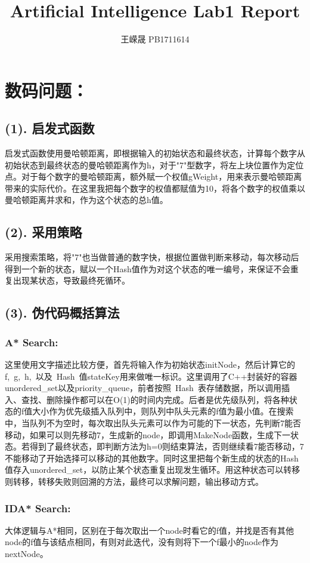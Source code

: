 \documentclass{article}
\title{Artificial Intelligence Lab1 Report}
\author{王嵘晟 \quad PB1711614}
\date{}
\begin{document}
	\maketitle
	\section{数码问题：}
	\subsection*{(1). 启发式函数}
	启发式函数使用曼哈顿距离，即根据输入的初始状态和最终状态，计算每个数字从初始状态到最终状态的曼哈顿距离作为h，对于"7"型数字，将左上块位置作为定位点。对于每个数字的曼哈顿距离，额外赋一个权值gWeight，用来表示曼哈顿距离带来的实际代价。在这里我把每个数字的权值都赋值为10，将各个数字的权值乘以曼哈顿距离并求和，作为这个状态的总h值。
	\subsection*{(2). 采用策略}
	采用搜索策略，将"7"也当做普通的数字快，根据位置做判断来移动，每次移动后得到一个新的状态，赋以一个Hash值作为对这个状态的唯一编号，来保证不会重复出现某状态，导致最终死循环。
	\subsection*{(3). 伪代码概括算法}
	\subsubsection*{A* Search:}
	这里使用文字描述比较方便，首先将输入作为初始状态initNode，然后计算它的f,\ g,\ h,\ 以及\ Hash\ 值stateKey用来做唯一标识。这里调用了C++封装好的容器unordered\_set以及priority\_queue，前者按照\ Hash\ 表存储数据，所以调用插入、查找、删除操作都可以在O(1)的时间内完成。后者是优先级队列，将各种状态的f值大小作为优先级插入队列中，则队列中队头元素的f值为最小值。在搜索中，当队列不为空时，每次取出队头元素可以作为可能的下一状态，先判断7能否移动，如果可以则先移动7，生成新的node，即调用MakeNode函数，生成下一状态。若得到了最终状态，即判断方法为h=0则结束算法，否则继续看7能否移动，7不能移动了开始选择可以移动的其他数字。同时这里把每个新生成的状态的Hash值存入unordered\_set，以防止某个状态重复出现发生循环。用这种状态可以转移则转移，转移失败则回溯的方法，最终可以求解问题，输出移动方式。
	\subsubsection*{IDA* Search:}
	大体逻辑与A*相同，区别在于每次取出一个node时看它的f值，并找是否有其他node的f值与该结点相同，有则对此迭代，没有则将下一个f最小的node作为nextNode。
\end{document}
